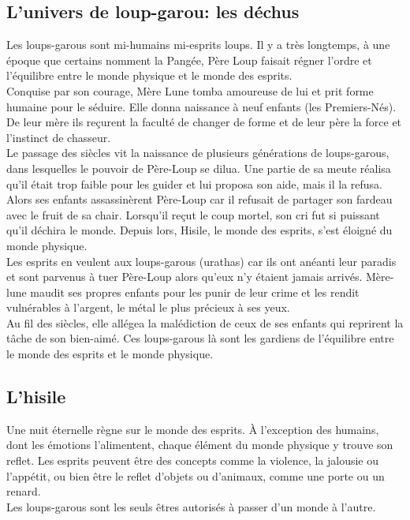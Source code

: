 \documentclass[oneside,12pt]{book}
\begin{document}
\begin{flushleft}
        \section{L'univers de loup-garou: les déchus}
       Les loups-garous sont mi-humains mi-esprits loups. 
       Il y a très longtemps, à une époque que certains nomment la Pangée, 
       Père Loup faisait régner l'ordre et l’équilibre entre le monde physique et le monde des esprits.\\ 
       Conquise par son courage, Mère Lune tomba amoureuse de lui et prit forme humaine pour le séduire. 
       Elle donna naissance à neuf enfants (les Premiers-Nés). 
       De leur mère ils reçurent la faculté de changer de forme et de leur père la force et l'instinct de chasseur.\\ 
       Le passage des siècles vit la naissance de plusieurs générations de loups-garous, 
       dans lesquelles le pouvoir de Père-Loup se dilua. 
       Une partie de sa meute réalisa qu'il était trop faible pour les guider et lui proposa son aide, mais il la refusa. Alors ses enfants assassinèrent Père-Loup car il refusait de partager son fardeau avec le fruit de sa chair. Lorsqu’il reçut le coup mortel, son cri fut si puissant qu’il déchira le monde. Depuis lors, Hisile, le monde des esprits, s’est éloigné du monde physique.\\ Les esprits en veulent aux loups-garous (urathas) car ils ont anéanti leur paradis et sont parvenus à tuer Père-Loup alors qu’eux n’y étaient jamais arrivés. Mère-lune maudit ses propres enfants pour les punir de leur crime et les rendit vulnérables à l'argent, le métal le plus précieux à ses yeux.\\ 
       Au fil des siècles, elle allégea la malédiction de ceux de ses enfants qui reprirent la tâche de son bien-aimé. 
       Ces loups-garous là sont les gardiens de l’équilibre entre le monde des esprits et le monde physique.  \\
   \subsection{L'hisile}    
Une nuit éternelle règne sur le monde des esprits. 
À l’exception des humains, dont les émotions l’alimentent, chaque élément du monde physique y trouve son reflet. 
Les esprits peuvent être des concepts comme la violence, la jalousie ou l'appétit, ou bien être le reflet d’objets ou d’animaux, comme une porte ou un renard.\\ Les loups-garous sont les seuls êtres autorisés à passer d’un monde à l’autre.


\end{flushleft}
\end{document}
